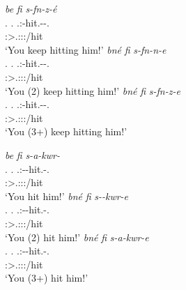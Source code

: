 \begin{exe}
\ex
\label{ex140}
\begin{xlist}
	\ex %
	\glll \emph{be} \emph{fi} \emph{s-fn-z-é}\\
	 \Ssg{}.\Erg{} \Third{}.\Abs{} \Tsg{}.\Masc{}:\Bet{}-hit.\Ext{}-\Ndu{}-\Ssg{}.\Imp{}\\
	 {} {} \footnotesize{\Ssg:\Sbj>\Tsg.\Masc:\Obj:\Imp:\Ipfv/hit}\\
	\trans `You keep hitting him!'
	\label{ex141}
	\ex %
	\glll \emph{bné} \emph{fi} \emph{s-fn-n-e}\\
	 \Snsg{}.\Erg{} \Third{}.\Abs{} \Tsg{}.\Masc{}:\Bet{}-hit.\Ext{}-\Du{}-\Snsg{}.\Imp{}\\
	  {} {} \footnotesize{\Sdu:\Sbj>\Tsg.\Masc:\Obj:\Imp:\Ipfv/hit}\\
	\trans `You (2) keep hitting him!'
	\label{ex142}
	\ex %
	\glll \emph{bné} \emph{fi} \emph{s-fn-z-e}\\
	 \Snsg{}.\Erg{} \Third{}.\Abs{} \Tsg{}.\Masc{}:\Bet{}-hit.\Ext{}-\Ndu{}-\Snsg{}.\Imp{}\\
	  {} {} \footnotesize{\Spl:\Sbj>\Tsg.\Masc:\Obj:\Imp:\Ipfv/hit}\\
	\trans `You (3+) keep hitting him!'
	\label{ex143}
\end{xlist}
\end{exe}%
\begin{exe}
\ex
\label{ex144}
\begin{xlist}
	\ex %
	\glll \emph{be} \emph{fi} \emph{s-a-kwr-\Zero{}}\\
	\Ssg{}.\Erg{} \Third{}.\Abs{} \Tsg{}.\Masc{}:\Bet{}-\Ndu{}-hit.\Rs{}-\Ssg{}.\Imp{}\\
	{} {} \footnotesize{\Ssg:\Sbj>\Tsg.\Masc:\Obj:\Imp:\Pfv/hit}\\
	\trans `You hit him!'
	\label{ex145}
	\ex %
	\glll \emph{bné} \emph{fi} \emph{s-\Zero{}-kwr-e}\\
	\Snsg{}.\Erg{} \Third{}.\Abs{} \Tsg{}.\Masc{}:\Bet{}-\Du{}-hit.\Rs{}-\Snsg{}.\Imp{}\\
	{} {} \footnotesize{\Sdu:\Sbj>\Tsg.\Masc:\Obj:\Imp:\Pfv/hit}\\
	\trans `You (2) hit him!'
	\label{ex146}
	\ex %
	\glll \emph{bné} \emph{fi} \emph{s-a-kwr-e}\\
	\Snsg{}.\Erg{} \Third{}.\Abs{} \Tsg{}.\Masc{}:\Bet{}-\Ndu{}-hit.\Rs{}-\Snsg{}.\Imp{}\\
	{} {} \footnotesize{\Spl:\Sbj>\Tsg.\Masc:\Obj:\Imp:\Pfv/hit}\\
	\trans `You (3+) hit him!'
	\label{ex147}
\end{xlist}
\end{exe}%

